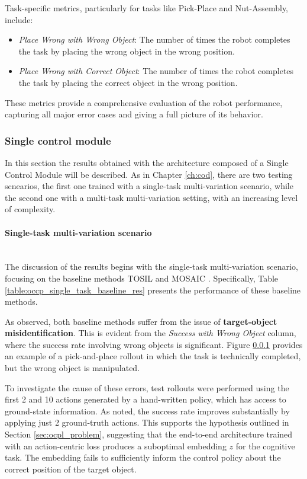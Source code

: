 Task-specific metrics, particularly for tasks like Pick-Place and Nut-Assembly, include:

\begin{itemize}
    \item \textit{Place Wrong with Wrong Object}: The number of times the robot completes the task by placing the wrong object in the wrong position.
    \item \textit{Place Wrong with Correct Object}: The number of times the robot completes the task by placing the correct object in the wrong position.
\end{itemize}

These metrics provide a comprehensive evaluation of the robot performance, capturing all major error cases and giving a full picture of its behavior.

\subsubsection{Single control module}
In this section the results obtained with the architecture composed of a Single Control Module will be described. As in Chapter \ref{ch:cod}, there are two testing scnearios, the first one trained with a single-task  multi-variation scenario, while the second one with a multi-task multi-variation setting, with an increasing level of complexity.
\label{sec:ocpl_results_scm}
\paragraph*{Single-task multi-variation scenario}\mbox{}\\

The discussion of the results begins with the single-task multi-variation scenario, focusing on the baseline methods TOSIL \cite{dasari2021transformers_one_shot} and MOSAIC \cite{mandi2022towards_more_generalizable_one_shot}. Specifically, Table \ref{table:occp_single_task_baseline_res} presents the performance of these baseline methods. 


As observed, both baseline methods suffer from the issue of \textbf{target-object misidentification}. This is evident from the \textit{Success with Wrong Object} column, where the success rate involving wrong objects is significant. Figure \ref{} provides an example of a pick-and-place rollout in which the task is technically completed, but the wrong object is manipulated.

To investigate the cause of these errors, test rollouts were performed using the first 2 and 10 actions generated by a hand-written policy, which has access to ground-state information. As noted, the success rate improves substantially by applying just 2 ground-truth actions. This supports the hypothesis outlined in Section \ref{sec:ocpl_problem}, suggesting that the end-to-end architecture trained with an action-centric loss produces a suboptimal embedding $z$ for the cognitive task. The embedding fails to sufficiently inform the control policy about the correct position of the target object.

